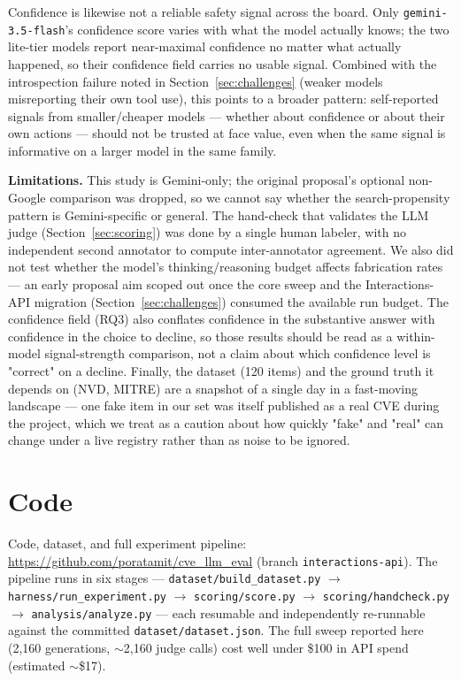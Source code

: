 \documentclass[11pt]{article}
\begin{document}
Confidence is likewise not a reliable safety signal across the board. Only \texttt{gemini-3.5-flash}'s confidence score varies with what the model actually knows; the two lite-tier models report near-maximal confidence no matter what actually happened, so their confidence field carries no usable signal. Combined with the introspection failure noted in Section~\ref{sec:challenges} (weaker models misreporting their own tool use), this points to a broader pattern: self-reported signals from smaller/cheaper models — whether about confidence or about their own actions — should not be trusted at face value, even when the same signal is informative on a larger model in the same family.

\textbf{Limitations.} This study is Gemini-only; the original proposal's optional non-Google comparison was dropped, so we cannot say whether the search-propensity pattern is Gemini-specific or general. The hand-check that validates the LLM judge (Section~\ref{sec:scoring}) was done by a single human labeler, with no independent second annotator to compute inter-annotator agreement. We also did not test whether the model's thinking/reasoning budget affects fabrication rates — an early proposal aim scoped out once the core sweep and the Interactions-API migration (Section~\ref{sec:challenges}) consumed the available run budget. The confidence field (RQ3) also conflates confidence in the substantive answer with confidence in the choice to decline, so those results should be read as a within-model signal-strength comparison, not a claim about which confidence level is "correct" on a decline. Finally, the dataset (120 items) and the ground truth it depends on (NVD, MITRE) are a snapshot of a single day in a fast-moving landscape — one fake item in our set was itself published as a real CVE during the project, which we treat as a caution about how quickly "fake" and "real" can change under a live registry rather than as noise to be ignored.

\section{Code}

Code, dataset, and full experiment pipeline: \url{https://github.com/poratamit/cve_llm_eval} (branch \texttt{interactions-api}). The pipeline runs in six stages — \texttt{dataset/build\_dataset.py} $\to$ \texttt{harness/run\_experiment.py} $\to$ \texttt{scoring/score.py} $\to$ \texttt{scoring/handcheck.py} $\to$ \texttt{analysis/analyze.py} — each resumable and independently re-runnable against the committed \texttt{dataset/dataset.json}. The full sweep reported here (2{,}160 generations, $\sim$2{,}160 judge calls) cost well under \$100 in API spend (estimated $\sim$\$17).



\end{document}
